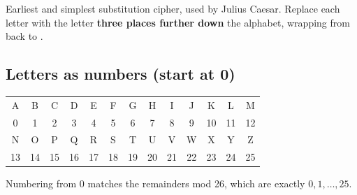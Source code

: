 \begin{keybox}
Earliest and simplest substitution cipher, used by Julius Caesar. Replace each letter with the letter \textbf{three places further down} the alphabet, wrapping from  back to .
\end{keybox}

\subsection{Letters as numbers (start at 0)}
\begin{center}\small\setlength{\tabcolsep}{4pt}
\begin{tabular}{*{13}{c}}
\toprule
A&B&C&D&E&F&G&H&I&J&K&L&M\\
0&1&2&3&4&5&6&7&8&9&10&11&12\\
\midrule
N&O&P&Q&R&S&T&U&V&W&X&Y&Z\\
13&14&15&16&17&18&19&20&21&22&23&24&25\\
\bottomrule
\end{tabular}
\end{center}
Numbering from 0 matches the remainders mod 26, which are exactly $0,1,\dots,25$.

